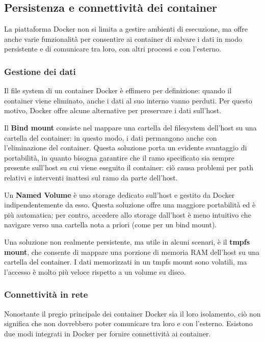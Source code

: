 \subsection{Persistenza e connettività dei container}
La piattaforma Docker non si limita a gestire ambienti di esecuzione, ma offre anche varie funzionalità per consentire ai container di salvare i dati in modo persistente e di comunicare tra loro, con altri processi e con l'esterno.

\subsubsection{Gestione dei dati}
Il file system di un container Docker è effimero per definizione: quando il container viene eliminato, anche i dati al suo interno vanno perduti. Per questo motivo, Docker offre alcune alternative per preservare i dati sull'host.

Il \textbf{Bind mount} consiste nel mappare una cartella del filesystem dell'host su una cartella del container: in questo modo, i dati permangono anche con l'eliminazione del container. Questa soluzione porta un evidente svantaggio di portabilità, in quanto bisogna garantire che il ramo specificato sia sempre presente sull'host su cui viene eseguito il container: ciò causa problemi per path relativi e interventi inattesi sul ramo da parte dell'host.

Un \textbf{Named Volume} è uno storage dedicato sull'host e gestito da Docker indipendentemente da esso. Questa soluzione offre una maggiore portabilità ed è più automatica; per contro, accedere allo storage dall'host è meno intuitivo che navigare verso una cartella nota a priori (come per un bind mount).

Una soluzione non realmente persistente, ma utile in alcuni scenari, è il \textbf{tmpfs mount}, che consente di mappare una porzione di memoria RAM dell'host su una cartella del container. I dati memorizzati in un tmpfs mount sono volatili, ma l'accesso è molto più veloce rispetto a un volume su disco.

\subsubsection{Connettività in rete}
Nonostante il pregio principale dei container Docker sia il loro isolamento, ciò non significa che non dovrebbero poter comunicare tra loro e con l'esterno. Esistono due modi integrati in Docker per fornire connettività ai container.

